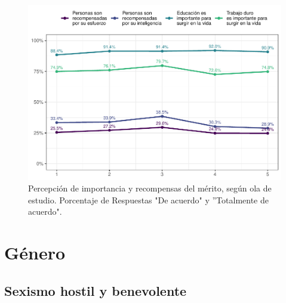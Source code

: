 \documentclass[
  12pt,
]{book}
\begin{document}
\begin{figure}

{\centering \includegraphics{reporte-elsoc_files/figure-latex/merit-wave-1} 

}

\caption{Percepción de importancia y recompensas del mérito, según ola de estudio. Porcentaje de Respuestas "De acuerdo" y ”Totalmente de acuerdo".}\label{fig:merit-wave}
\end{figure}

\hypertarget{guxe9nero}{%
\chapter{Género}\label{guxe9nero}}

\hypertarget{sexismo-hostil-y-benevolente}{%
\section{Sexismo hostil y benevolente}\label{sexismo-hostil-y-benevolente}}
\end{document}
